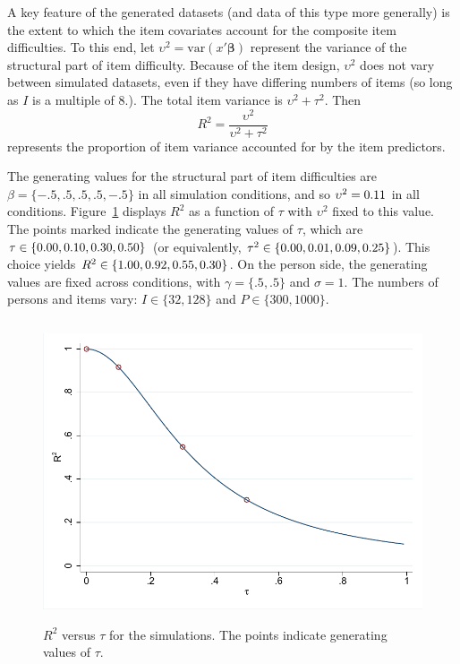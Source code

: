 \documentclass[12pt, letterpaper]{article}
\begin{document}


A key feature of the generated datasets (and data of this type more generally) is the extent to which the item covariates account for the composite item difficulties. To this end, let $\upsilon^2 = \mathrm{var}(x'\mathbf{\beta})$ represent the variance of the structural part of item difficulty. Because of the item design, $\upsilon^2$ does not vary between simulated datasets, even if they have differing numbers of items (so long as $I$ is a multiple of $8$.). The total item variance is $\upsilon^2 + \tau^2$. Then
\begin{equation}
R^2 = \frac{\upsilon^2}{\upsilon^2 + \tau^2}
\end{equation}
represents the proportion of item variance accounted for by the item predictors. 

The generating values for the structural part of item difficulties are $\beta = \{ -.5, .5, .5, .5, -.5 \}$ in all simulation conditions, and so $\upsilon^2 = 0.11$ in all conditions. Figure~\ref{fig:rsq-vs-tau} displays $R^2$ as a function of $\tau$ with $\upsilon^2$ fixed to this value. The points marked indicate the generating values of $\tau$, which are $\tau \in \{0.00, 0.10, 0.30, 0.50\}$ (or equivalently,  $\tau^2 \in \{0.00, 0.01, 0.09, 0.25\}$). This choice yields $R^2 \in \{1.00, 0.92, 0.55, 0.30\}$. On the person side, the generating values are fixed across conditions, with $\gamma = \{ .5, .5 \}$ and $\sigma = 1$. The numbers of persons and items vary: $I \in \{32, 128\}$ and $P \in \{300, 1000\}$.

\begin{figure}[htbp]
	\centering
	\includegraphics[height=3.5in, trim = 1mm 1mm 1mm 1mm, clip=true]
		{chapter_2/figs/rsq_vs_tau.pdf}
	\caption{$R^2$ versus $\tau$ for the simulations. The points indicate generating values of $\tau$.}
	\label{fig:rsq-vs-tau}
\end{figure}
\end{document}
